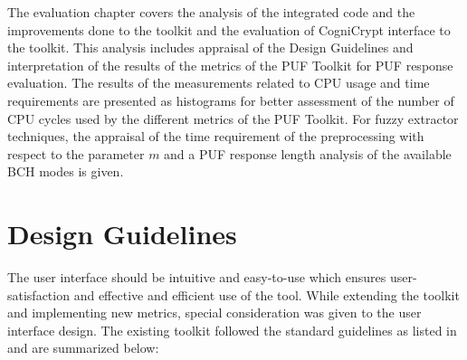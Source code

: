 The evaluation chapter covers the analysis of the integrated code and the improvements done to the toolkit and the evaluation of CogniCrypt interface to the toolkit. This analysis includes appraisal of the Design Guidelines and interpretation of the results of the metrics of the PUF Toolkit for PUF response evaluation. The results of the measurements related to CPU usage and time requirements are presented as
histograms for better assessment of the number of CPU cycles used by the different metrics of the PUF Toolkit. For fuzzy extractor techniques, the appraisal of the time requirement of the preprocessing  with respect to the parameter $m$ and a PUF response length analysis of the available BCH modes is given.\\

\section{Design Guidelines}
The user interface should be intuitive and easy-to-use which ensures user-satisfaction and effective and efficient use of the tool. While extending the toolkit and implementing new metrics, special consideration was given to the user interface design. The existing toolkit followed the standard guidelines as listed in \cite{67} and are summarized below:

